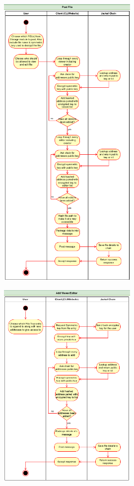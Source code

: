 \documentclass[a4paper]{article}
\begin{document}
\begin{figure}[!htbp]
\centering
\includegraphics[width=0.6\textwidth]{assets/filetree3.png}
\end{figure}

\begin{figure}[!htbp]
\centering
\includegraphics[width=0.6\textwidth]{assets/filetree4.png}
\end{figure}
\end{document}
